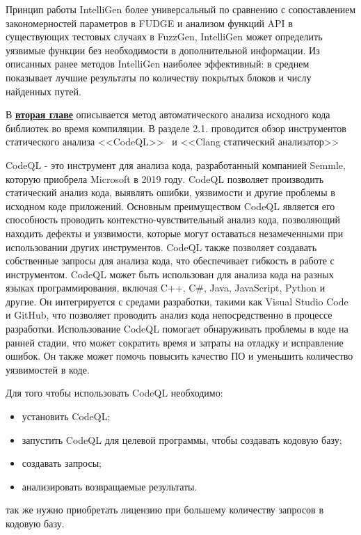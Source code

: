 Принцип работы IntelliGen более универсальный по сравнению с сопоставлением закономерностей параметров в FUDGE и анализом функций API в существующих тестовых случаях в FuzzGen, IntelliGen может определить уязвимые функции без необходимости в дополнительной информации. Из описанных ранее методов IntelliGen наиболее эффективный: в среднем показывает лучшие результаты по количеству покрытых блоков и числу найденных путей.


В \underline{\textbf{вторая главе}} описывается метод автоматического анализа исходного кода библиотек во время компиляции. 
В разделе 2.1. проводится обзор инструментов статического анализа <<CodeQL>>~\autocite{CodeQL} и <<Clang статический анализатор>>~\autocite{clangSAsite}

CodeQL - это инструмент для анализа кода, разработанный компанией Semmle, которую приобрела Microsoft в 2019 году. CodeQL позволяет производить статический анализ кода, выявлять ошибки, уязвимости и другие проблемы в исходном коде приложений. Основным преимуществом CodeQL является его способность проводить контекстно-чувствительный анализ кода, позволяющий находить дефекты и уязвимости, которые могут оставаться незамеченными при использовании других инструментов. CodeQL также позволяет создавать собственные запросы для анализа кода, что обеспечивает гибкость в работе с инструментом.
CodeQL может быть использован для анализа кода на разных языках программирования, включая C++, C\#, Java, JavaScript, Python и другие. Он интегрируется с средами разработки, такими как Visual Studio Code и GitHub, что позволяет проводить анализ кода непосредственно в процессе разработки. Использование CodeQL помогает обнаруживать проблемы в коде на ранней стадии, что может сократить время и затраты на отладку и исправление ошибок. Он также может помочь повысить качество ПО и уменьшить количество уязвимостей в коде.

Для того чтобы использовать CodeQL необходимо: 
\begin{itemize}
    \item установить CodeQL;
    \item запустить CodeQL для целевой программы, чтобы создавать кодовую базу;
    \item создавать запросы;
    \item анализировать возвращаемые результаты.
\end{itemize}
так же нужно приобретать лицензию при большему количеству запросов в кодовую базу.

